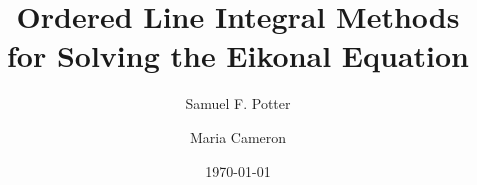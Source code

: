 \documentclass{article}
\begin{document}
\title{Ordered Line Integral Methods \\ for Solving the Eikonal Equation}
\author{Samuel F. Potter \and Maria Cameron}
\date{\today}

\maketitle






% 

% 
% 
% 
% 


% 
% 


{}
\end{document}
